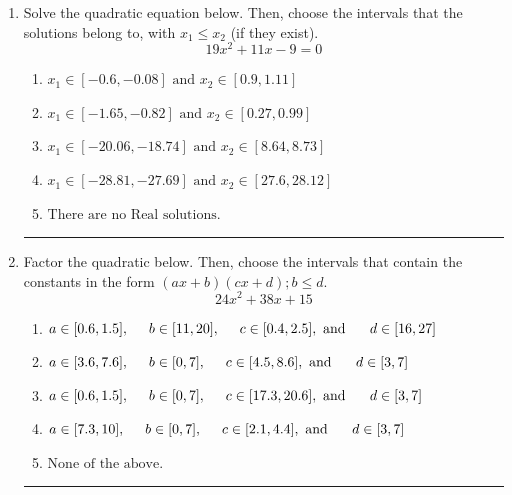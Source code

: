 \documentclass[14pt]{extbook}
\newcommand{\litem}[1]{\item#1\hspace*{-1cm}\rule{\textwidth}{0.4pt}}
\begin{document}
\begin{enumerate}
\litem{
Solve the quadratic equation below. Then, choose the intervals that the solutions belong to, with $x_1 \leq x_2$ (if they exist).\[ 19x^{2} +11 x -9 = 0 \]\begin{enumerate}[label=\Alph*.]
\item \( x_1 \in [-0.6, -0.08] \text{ and } x_2 \in [0.9, 1.11] \)
\item \( x_1 \in [-1.65, -0.82] \text{ and } x_2 \in [0.27, 0.99] \)
\item \( x_1 \in [-20.06, -18.74] \text{ and } x_2 \in [8.64, 8.73] \)
\item \( x_1 \in [-28.81, -27.69] \text{ and } x_2 \in [27.6, 28.12] \)
\item \( \text{There are no Real solutions.} \)

\end{enumerate} }
\litem{
Factor the quadratic below. Then, choose the intervals that contain the constants in the form $(ax+b)(cx+d); b \leq d.$\[ 24x^{2} +38 x + 15 \]\begin{enumerate}[label=\Alph*.]
\item \( a \in [0.6, 1.5], \hspace*{5mm} b \in [11, 20], \hspace*{5mm} c \in [0.4, 2.5], \text{ and } \hspace*{5mm} d \in [16, 27] \)
\item \( a \in [3.6, 7.6], \hspace*{5mm} b \in [0, 7], \hspace*{5mm} c \in [4.5, 8.6], \text{ and } \hspace*{5mm} d \in [3, 7] \)
\item \( a \in [0.6, 1.5], \hspace*{5mm} b \in [0, 7], \hspace*{5mm} c \in [17.3, 20.6], \text{ and } \hspace*{5mm} d \in [3, 7] \)
\item \( a \in [7.3, 10], \hspace*{5mm} b \in [0, 7], \hspace*{5mm} c \in [2.1, 4.4], \text{ and } \hspace*{5mm} d \in [3, 7] \)
\item \( \text{None of the above.} \)


\end{enumerate}}
\end{enumerate}
\end{document}

